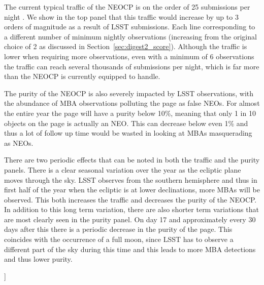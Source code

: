 \documentclass[twocolumn]{aastex631}
\newcommand{\todo}[1]{{\color{red}{[TODO: #1}]}}
\newcommand{\needcite}{{\color{magenta}{(needs citation)}}}
\begin{document}
The current typical traffic of the NEOCP is on the order of 25 submissions per night \needcite{}. We show in the top panel that this traffic would increase by up to 3 orders of magnitude as a result of LSST submissions. Each line corresponding to a different number of minimum nightly observations (increasing from the original choice of 2 as discussed in Section~\ref{sec:digest2_score}). Although the traffic is lower when requiring more observations, even with a minimum of 6 observations the traffic can reach several thousands of submissions per night, which is far more than the NEOCP is currently equipped to handle.

The purity of the NEOCP is also severely impacted by LSST observations, with the abundance of MBA observations polluting the page as false NEOs. For almost the entire year the page will have a purity below 10\%, meaning that only 1 in 10 objects on the page is actually an NEO. This can decrease below even 1\% and thus a lot of follow up time would be wasted in looking at MBAs masquerading as NEOs.

There are two periodic effects that can be noted in both the traffic and the purity panels. There is a clear seasonal variation over the year as the ecliptic plane moves through the sky. LSST observes from the southern hemisphere and thus in first half of the year when the ecliptic is at lower declinations, more MBAs will be observed. This both increases the traffic and decreases the purity of the NEOCP. In addition to this long term variation, there are also shorter term variations that are most clearly seen in the purity panel. On day 17 and approximately every 30 days after this there is a periodic decrease in the purity of the page. This coincides with the occurrence of a full moon, since LSST has to observe a different part of the sky during this time and this leads to more MBA detections and thus lower purity.

\todo{Check that I explained both of these effects correctly (particularly the moon one)}
\end{document}
